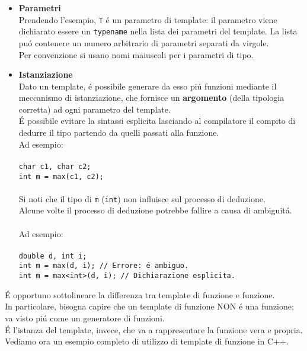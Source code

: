 \documentclass{article}
\begin{document}
\begin{itemize}
\item \textbf{\textcolor{blu}{Parametri}}\\Prendendo l'esempio, \texttt{T} \'e un parametro di template: il parametro viene dichiarato essere un \texttt{typename} nella lista dei parametri del template. La lista pu\'o contenere un numero arbitrario di parametri separati da virgole.\\Per convenzione si usano nomi maiuscoli per i parametri di tipo. \\
\item \textbf{\textcolor{blu}{Istanziazione}}\\Dato un template, \'e possibile generare da esso pi\'u funzioni mediante il meccanismo di istanziazione, che fornisce un \textbf{argomento} (della tipologia corretta) ad ogni parametro del template.\\\'E possibile evitare la sintassi esplicita lasciando al compilatore il compito di dedurre il tipo partendo da quelli passati alla funzione. \\ Ad esempio: \\ \\ \texttt{char c1, char c2; \\ int m = max(c1, c2);} \\ \\ Si noti che il tipo di \texttt{m} (\texttt{int}) non influisce sul processo di deduzione. \\ Alcune volte il processo di deduzione potrebbe fallire a causa di ambiguit\'a.\\ \\Ad esempio: \\ \\ \texttt{double d, int i; \\ int m = max(d, i); \textcolor{grigio}{// Errore: \'e ambiguo. }\\ int m = max<int>(d, i); \textcolor{grigio}{// Dichiarazione esplicita.}} \\
\end{itemize}
\'E opportuno sottolineare la differenza tra template di funzione e funzione. \\In particolare, bisogna capire che un template di funzione NON \'e una funzione; va visto pi\'u come un generatore di funzioni.\\\'E l'istanza del template, invece, che va a rappresentare la funzione vera e propria.\\ Vediamo ora un esempio completo di utilizzo di template di funzione in C++. \\ \\
\end{document}
